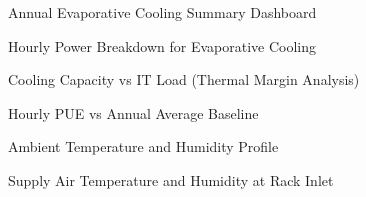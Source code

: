 \documentclass[12pt,a4paper]{report}
\begin{document}
\begin{figure}[H]
\centering
{}
\caption{Annual Evaporative Cooling Summary Dashboard}
\label{fig:evap_summary}
\end{figure}

\begin{figure}[H]
\centering
{}
\caption{Hourly Power Breakdown for Evaporative Cooling}
\label{fig:evap_power}
\end{figure}

\begin{figure}[H]
\centering
{}
\caption{Cooling Capacity vs IT Load (Thermal Margin Analysis)}
\label{fig:evap_capacity}
\end{figure}

\begin{figure}[H]
\centering
{}
\caption{Hourly PUE vs Annual Average Baseline}
\label{fig:evap_pue}
\end{figure}

\begin{figure}[H]
\centering
{}
\caption{Ambient Temperature and Humidity Profile}
\label{fig:evap_temp_hum}
\end{figure}

\begin{figure}[H]
\centering
{}
\caption{Supply Air Temperature and Humidity at Rack Inlet}
\label{fig:evap_supply}
\end{figure}
\end{document}
